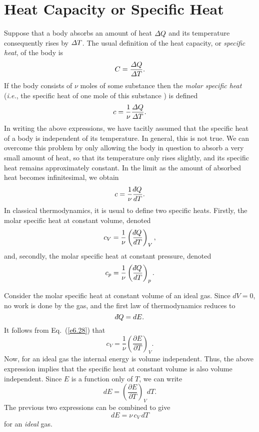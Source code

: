 \section{Heat Capacity or Specific Heat}
Suppose that a body absorbs an amount of heat ${\mit\Delta} Q$ 
and its temperature consequently rises by ${\mit\Delta} T$. The usual definition
of the heat capacity, or {\em specific heat}, of the body is
\begin{equation}
C = \frac{{\mit\Delta} Q}{{\mit\Delta} T}.
\end{equation}
If the body consists of $\nu$ moles of some substance  then the {\em molar
specific heat}\/ ({\em i.e.}, the specific heat of one mole of this substance ) is
defined 
\begin{equation}
c = \frac{1}{\nu}\frac{{\mit\Delta} Q}{{\mit\Delta} T}.
\end{equation}
In writing  the above expressions, we have tacitly assumed that the specific heat
of a body is independent of its temperature. In general, this is not true. We
can overcome this problem by only allowing the body in question to absorb a very
small  amount of heat, so that its temperature only rises slightly, and its 
specific heat remains approximately constant. In the limit as the amount of
absorbed heat becomes infinitesimal, we obtain
\begin{equation}
c = \frac{1}{\nu}\frac{\dbar Q}{dT}.
\end{equation}
In classical thermodynamics, it is usual to define two specific heats. Firstly,
the molar specific heat at constant volume, denoted
\begin{equation}
c_V = \frac{1}{\nu}\left(\frac{\dbar Q}{dT}\right)_V,\label{e6.28}
\end{equation}
and, secondly, the molar specific heat at constant pressure, denoted
\begin{equation}
c_p = \frac{1}{\nu}\left(\frac{\dbar Q}{dT}\right)_p.
\end{equation}

Consider the molar specific heat at constant volume of an ideal gas. 
Since $dV=0$, no work is done by
the gas,
and the first law of thermodynamics reduces to
\begin{equation}
\dbar Q = dE.
\end{equation}
It follows from Eq.~(\ref{e6.28}) that 
\begin{equation}
c_V = \frac{1}{\nu}\left(\frac{\partial E}{\partial T}\right)_V.
\end{equation}
Now, for an ideal gas the internal energy is volume independent.
Thus, the above expression  implies that the specific heat at constant volume is also
volume independent. Since $E$ is  a function only of $T$, we can write
\begin{equation}
dE = \left(\frac{\partial E}{\partial T}\right)_V dT.
\end{equation}
The previous two expressions can be combined to give
\begin{equation}
dE = \nu\, c_V\,dT
\end{equation}
for an {\em ideal}\/ gas. 


